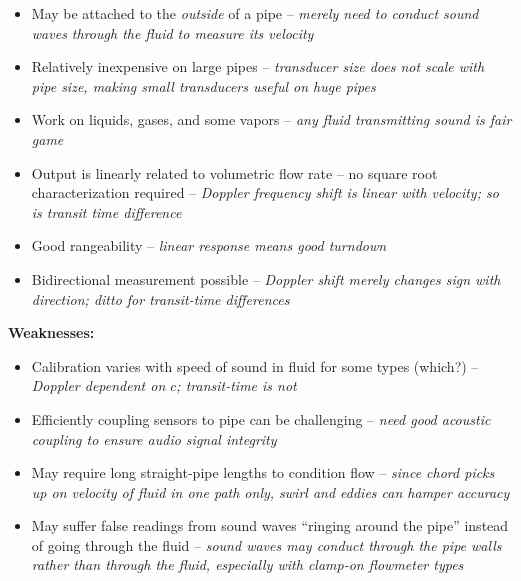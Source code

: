 \begin{itemize}
\item{} May be attached to the {\it outside} of a pipe -- {\it merely need to conduct sound waves through the fluid to measure its velocity}
\item{} Relatively inexpensive on large pipes -- {\it transducer size does not scale with pipe size, making small transducers useful on huge pipes}
\item{} Work on liquids, gases, and some vapors -- {\it any fluid transmitting sound is fair game}
\item{} Output is linearly related to volumetric flow rate -- no square root characterization required -- {\it Doppler frequency shift is linear with velocity; so is transit time difference}
\item{} Good rangeability -- {\it linear response means good turndown}
\item{} Bidirectional measurement possible -- {\it Doppler shift merely changes sign with direction; ditto for transit-time differences}
\end{itemize}

\vskip 10pt

{\bf Weaknesses:}

\begin{itemize}
\item{} Calibration varies with speed of sound in fluid for some types (which?) -- {\it Doppler dependent on $c$; transit-time is not}
\item{} Efficiently coupling sensors to pipe can be challenging -- {\it need good acoustic coupling to ensure audio signal integrity}
\item{} May require long straight-pipe lengths to condition flow -- {\it since chord picks up on velocity of fluid in one path only, swirl and eddies can hamper accuracy}
\item{} May suffer false readings from sound waves ``ringing around the pipe'' instead of going through the fluid -- {\it sound waves may conduct through the pipe walls rather than through the fluid, especially with clamp-on flowmeter types}
\end{itemize}





